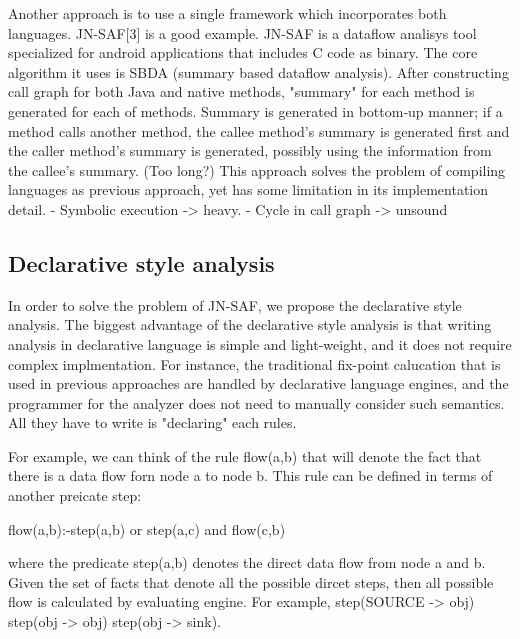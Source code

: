 Another approach is to use a single framework which incorporates both
languages. JN-SAF[3] is a good example.  JN-SAF is a dataflow analisys tool
specialized for android applications that includes C code as binary.  The core
algorithm it uses is SBDA (summary based dataflow analysis). After constructing
call graph for both Java and native methods, "summary" for each method is
generated for each of methods. Summary is generated in bottom-up manner; if a
method calls another method, the callee method's summary is generated first and
the caller method's summary is generated, possibly using the information from
the callee's summary. (Too long?) This approach solves the problem of compiling
languages as previous approach, yet has some limitation in its implementation
detail.
- Symbolic execution -> heavy. - Cycle in call graph -> unsound

\subsection{Declarative style analysis} In order to solve the problem of
JN-SAF, we propose the declarative style analysis.  The biggest advantage of
the declarative style analysis is that writing analysis in declarative language
is simple and light-weight, and it does not require complex implmentation. For
instance, the traditional fix-point calucation that is used in previous
approaches are handled by declarative language engines, and the programmer for
the analyzer does not need to manually consider such semantics. All they have
to write is "declaring" each rules.

For example, we can think of the rule flow(a,b) that will denote the fact that
there is a data flow forn node a to node b. This rule can be defined in terms of
another preicate step:

flow(a,b):-step(a,b) or step(a,c) and flow(c,b)

where the predicate step(a,b) denotes the direct data flow from node a and b.
Given the set of facts that denote all the possible dircet steps,
then all possible flow is calculated by evaluating engine. For example,
step(SOURCE -> obj)
step(obj -> obj)
step(obj -> sink).
